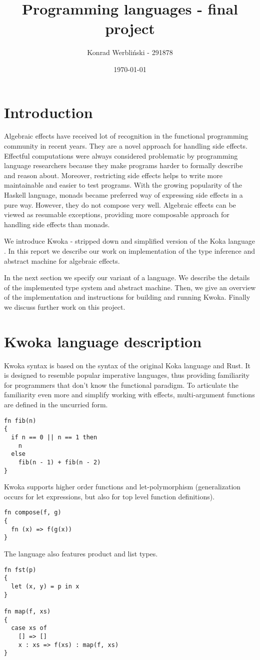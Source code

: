 \documentclass[a4paper]{article}
\author{Konrad Werbliński - 291878}
\title{Programming languages - final project}
\date{\today}
\begin{document}
\maketitle

\section{Introduction}
Algebraic effects have received lot of recognition in
the functional programming community in recent years.
They are a novel approach for handling side effects.
Effectful computations were always considered problematic by
programming language researchers because they make programs harder to
formally describe and reason about. Moreover, restricting side effects helps to
write more maintainable and easier to test programs.
With the growing popularity of the Haskell language, monads became preferred way of
expressing side effects in a pure way. However, they do not compose very well.
Algebraic effects can be viewed as resumable exceptions, providing more composable
approach for handling side effects than monads.

We introduce Kwoka - stripped down and simplified version of the Koka language \cite{Koka}.
In this report we describe our work on implementation of the
type inference \cite{leijen2017type} and abstract machine \cite{HandleWithCare} for algebraic effects.

In the next section we specify our variant of a language. We describe the
details of the implemented type system and abstract machine.
Then, we give an overview of the implementation and instructions for building and running Kwoka.
Finally we discuss further work on this project.

\section{Kwoka language description}
Kwoka syntax is based on the syntax of the original Koka language and Rust.
It is designed to resemble popular imperative languages, thus providing familiarity
for programmers that don't know the functional paradigm.
To articulate the familiarity even more and simplify working with effects, multi-argument
functions are defined in the uncurried form.
\begin{verbatim}
fn fib(n)
{
  if n == 0 || n == 1 then
    n
  else
    fib(n - 1) + fib(n - 2)
}
\end{verbatim}
Kwoka supports higher order functions and let-polymorphism
(generalization occurs for let expressions, but also for top level function definitions).
\begin{verbatim}
fn compose(f, g)
{
  fn (x) => f(g(x))
}
\end{verbatim}
The language also features product and list types.
\begin{verbatim}
fn fst(p)
{
  let (x, y) = p in x
}

fn map(f, xs)
{
  case xs of
    [] => []
    x : xs => f(xs) : map(f, xs)
}
\end{verbatim}
\end{document}
